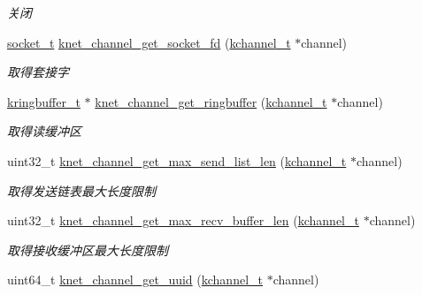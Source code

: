 \begin{DoxyCompactItemize}
\begin{DoxyCompactList}\small\item\em 关闭 \end{DoxyCompactList}\item 
\hyperlink{a00056_a0d9e0afbf02fb6ed6c5b1415dce51b05_a0d9e0afbf02fb6ed6c5b1415dce51b05}{socket\+\_\+t} \hyperlink{a00051_aac1ff10cb6b113a65e108e4c7422c149_aac1ff10cb6b113a65e108e4c7422c149}{knet\+\_\+channel\+\_\+get\+\_\+socket\+\_\+fd} (\hyperlink{a00056_aca9cd34897582aa9969245a93cc62fb5_aca9cd34897582aa9969245a93cc62fb5}{kchannel\+\_\+t} $\ast$channel)
\begin{DoxyCompactList}\small\item\em 取得套接字 \end{DoxyCompactList}\item 
\hyperlink{a00056_a66d91f7667db1f0b2983fc25e1a20f1c_a66d91f7667db1f0b2983fc25e1a20f1c}{kringbuffer\+\_\+t} $\ast$ \hyperlink{a00051_ad289fcea4095b519b0ced40cfb89f693_ad289fcea4095b519b0ced40cfb89f693}{knet\+\_\+channel\+\_\+get\+\_\+ringbuffer} (\hyperlink{a00056_aca9cd34897582aa9969245a93cc62fb5_aca9cd34897582aa9969245a93cc62fb5}{kchannel\+\_\+t} $\ast$channel)
\begin{DoxyCompactList}\small\item\em 取得读缓冲区 \end{DoxyCompactList}\item 
uint32\+\_\+t \hyperlink{a00051_a26e5ba64b710a168b780e2b845ba3cca_a26e5ba64b710a168b780e2b845ba3cca}{knet\+\_\+channel\+\_\+get\+\_\+max\+\_\+send\+\_\+list\+\_\+len} (\hyperlink{a00056_aca9cd34897582aa9969245a93cc62fb5_aca9cd34897582aa9969245a93cc62fb5}{kchannel\+\_\+t} $\ast$channel)
\begin{DoxyCompactList}\small\item\em 取得发送链表最大长度限制 \end{DoxyCompactList}\item 
uint32\+\_\+t \hyperlink{a00051_aba9f33720ab9f2d3ae59a75cf4f7841a_aba9f33720ab9f2d3ae59a75cf4f7841a}{knet\+\_\+channel\+\_\+get\+\_\+max\+\_\+recv\+\_\+buffer\+\_\+len} (\hyperlink{a00056_aca9cd34897582aa9969245a93cc62fb5_aca9cd34897582aa9969245a93cc62fb5}{kchannel\+\_\+t} $\ast$channel)
\begin{DoxyCompactList}\small\item\em 取得接收缓冲区最大长度限制 \end{DoxyCompactList}\item 
uint64\+\_\+t \hyperlink{a00051_a232548ee5a65b9cdcd0475cefe8f9095_a232548ee5a65b9cdcd0475cefe8f9095}{knet\+\_\+channel\+\_\+get\+\_\+uuid} (\hyperlink{a00056_aca9cd34897582aa9969245a93cc62fb5_aca9cd34897582aa9969245a93cc62fb5}{kchannel\+\_\+t} $\ast$channel)

\end{DoxyCompactItemize}
